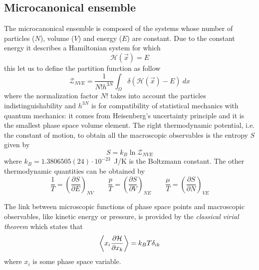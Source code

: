 \subsection{Microcanonical ensemble}
The microcanonical ensemble is composed of the systems whose number of particles ($N$), volume ($V$) and energy
($E$) are constant. Due to the constant energy it describes a Hamiltonian system for which
\begin{equation*}
	\mathcal{H}(\vec x) = E
\end{equation*}
this let us to define the partition function as follow
\begin{equation}
	\mathcal{Z}_{NVE} = \frac{1}{N!h^{3N}}\int_\Omega \delta(\mathcal{H}(\vec x) - E)\ dx
	\label{eq:micropartition}
\end{equation}
where the normalization factor $N!$ takes into account the particles indistinguishability and $h^{3N}$ is for
compatibility of statistical mechanics with quantum mechanics: it comes from Heisenberg’s uncertainty principle
and it is the smallest phase space volume element. The right thermodynamic potential, i.e. the constant of
motion, to obtain all the macroscopic observables is the entropy $S$ given by
\begin{equation*}
	S = k_B \ln \mathcal{Z}_{NVE}
\end{equation*}
where $k_B = 1.3806505(24) \cdot 10^{-23}$~J/K is the Boltzmann constant. The other thermodynamic quantities can
be obtained by
\begin{equation*}
	\frac{1}{T} = \left ( \frac{\partial S}{\partial E}\right )_{NV} \qquad \frac{p}{T} = \left ( \frac{\partial S}{\partial V}\right )_{NE} \qquad \frac{\mu}{T} = \left ( \frac{\partial S}{\partial N}\right )_{VE}
\end{equation*}

The link between microscopic functions of phase space points and macroscopic observables, like kinetic energy or
pressure, is provided by the \textit{classical virial theorem} which states that
\begin{equation}
	\left \langle x_i\frac{\partial\mathcal{H}}{\partial x_k} \right \rangle = k_B T \delta_{ik}
	\label{eq:virial}
\end{equation}
where $x_i$ is some phase space variable.

